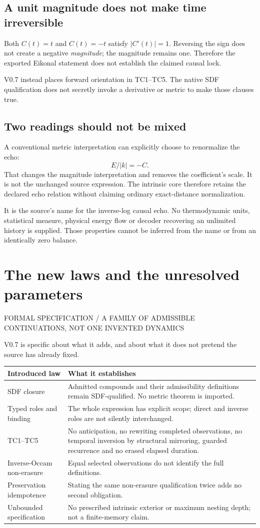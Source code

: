 \documentclass[11pt,a4paper]{article}
\newcommand{\newsec}[2]{\clearpage\section{#1}{\sffamily\footnotesize\color{teal}\MakeUppercase{#2}\par}\vspace{5pt}}
\begin{document}
\subsection{A unit magnitude does not make time irreversible}
Both $C(t)=t$ and $C(t)=-t$ satisfy $|C'(t)|=1$. Reversing the sign does not create a negative \emph{magnitude}; the magnitude remains one. Therefore the exported Eikonal statement does not establish the claimed causal lock.

V0.7 instead places forward orientation in TC1--TC5. The native SDF qualification does not secretly invoke a derivative or metric to make those clauses true.

\subsection{Two readings should not be mixed}
A conventional metric interpretation can explicitly choose to renormalize the echo:
\[
 E/|k|=-C.
\]
That changes the magnitude interpretation and removes the coefficient's scale. It is not the unchanged source expression. The intrinsic core therefore retains the declared echo relation without claiming ordinary exact-distance normalization.

\begin{boxx}
It is the source's name for the inverse-log causal echo. No thermodynamic units, statistical measure, physical energy flow or decoder recovering an unlimited history is supplied. Those properties cannot be inferred from the name or from an identically zero balance.
\end{boxx}

\newsec{The new laws and the unresolved parameters}{Formal specification / a family of admissible continuations, not one invented dynamics}
V0.7 is specific about what it adds, and about what it does not pretend the source has already fixed.

\begin{tabularx}{\linewidth}{@{}P{35mm}Y@{}}
\toprule
\textbf{Introduced law} & \textbf{What it establishes}\\\midrule
SDF closure & Admitted compounds and their admissibility definitions remain SDF-qualified. No metric theorem is imported.\\
Typed roles and binding & The whole expression has explicit scope; direct and inverse roles are not silently interchanged.\\
TC1--TC5 & No anticipation, no rewriting completed observations, no temporal inversion by structural mirroring, guarded recurrence and no erased elapsed duration.\\
Inverse-Occam non-erasure & Equal selected observations do not identify the full definitions.\\
Preservation idempotence & Stating the same non-erasure qualification twice adds no second obligation.\\
Unbounded specification & No prescribed intrinsic exterior or maximum nesting depth; not a finite-memory claim.\\
\bottomrule
\end{tabularx}
\end{document}
